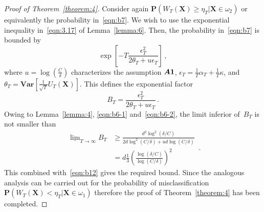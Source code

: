 \documentclass[lettersize,journal,onecolumn]{IEEEtran}
\theoremstyle{definition}
\newcommand{\Var}[1]{\mathbf{Var}\left[#1\right]}
\newcommand{\assumption}[1]{{\rm \boldsymbol{A#1}}}
\begin{document}
\begin{proof}[Proof of Theorem~\ref{theorem:4}]
	Consider again 
	$\mathbf{P}\left(W_{T}(\mathbf{X})\geq\eta_{T}|\mathbf{X}\in\omega_{2}\right)$ or
	equivalently the probability in~\eqref{eqn:b7}. We wish to use the exponential 
	inequality in~\eqref{eqn:3.17} of Lemma~\ref{lemma:6}. Then, the probability 
	in~\eqref{eqn:b7} is bounded by
	\begin{equation}
		\exp\left[
		-T \frac{\epsilon_{T}^{2}}{2\theta_{T}+u\epsilon_{T}}
		\right]
		\label{eqn:b12}\,,
	\end{equation}
	where $u=\log\left(\frac{C}{\delta}\right)$ characterizes the assumption 
	$\assumption{1}$, \mbox{$\epsilon_{T}=\frac{1}{T}\alpha_{T}+\frac{1}{T}\kappa$}, 
	and \mbox{$\theta_{T}=\Var{\frac{1}{\sqrt{T}}U_{T}(\mathbf{X})}$}. This defines 
	the exponential factor
	\begin{equation*}
		B_{T} = \frac{\epsilon_{T}^{2}}{2\theta_{T}+u\epsilon_{T}}
		\,.
	\end{equation*}
	Owing to Lemma~\ref{lemma:4}, \eqref{eqn:b6-1} and~\eqref{eqn:b6-2}, the limit inferior
	of~$B_{T}$ is not smaller than
	\begin{equation*}
		\begin{split}
			\underline{\lim}_{T\to\infty} B_{T} & \geq
			\frac{
				d^{2} \log^{2}(\delta/C)
			}{
				2d \log^{2}(C/\delta) + ud \log(C/\delta)
			} \\
			& = d \frac{1}{3} \left(
			\frac{\log(\delta/C)}{\log(C/\delta)}			
			\right)^{2}
		\end{split}
		\,.
	\end{equation*}	
	This combined with~\eqref{eqn:b12} gives the required bound. Since the analogous 
	analysis can be carried out for the probability of misclassification 
	$\mathbf{P}\left(W_{T}(\mathbf{X})<\eta_{T}|\mathbf{X}\in\omega_{1}\right)$ therefore
	the	proof of Theorem~\ref{theorem:4} has been completed.
\end{proof}

\section{}
\label{app:C}
\end{document}
